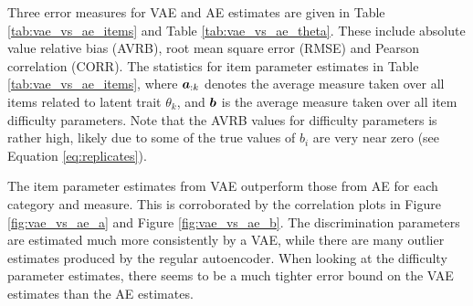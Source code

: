 Three error measures for VAE and AE estimates are given in Table \ref{tab:vae_vs_ae_items} and Table \ref{tab:vae_vs_ae_theta}. These include absolute value relative bias (AVRB), root mean square error (RMSE) and Pearson correlation (CORR). The statistics for item parameter estimates in Table \ref{tab:vae_vs_ae_items}, where $\boldsymbol{a}_{:k}$ denotes the average measure taken over all items related to latent trait $\theta_k$, and $\boldsymbol{b}$ is the average measure taken over all item difficulty parameters. Note that the AVRB values for difficulty parameters is rather high, likely due to some of the true values of $b_i$ are very near zero (see Equation \ref{eq:replicates}). 

The item parameter estimates from VAE outperform those from AE for each category and measure. This is corroborated by the correlation plots in Figure \ref{fig:vae_vs_ae_a} and Figure \ref{fig:vae_vs_ae_b}. The discrimination parameters are estimated much more consistently by a VAE, while there are many outlier estimates produced by the regular autoencoder. When looking at the difficulty parameter estimates, there seems to be a much tighter error bound on the VAE estimates than the AE estimates.

